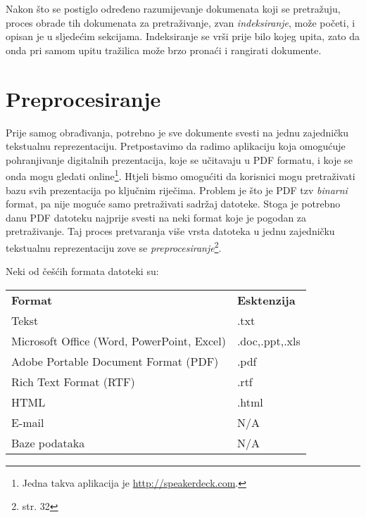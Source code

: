 \documentclass[11pt]{scrreprt}
\begin{document}
Nakon što se postiglo određeno razumijevanje dokumenata koji se pretražuju, proces obrade tih dokumenata za pretraživanje, zvan \textit{indeksiranje}, može početi, i opisan je u sljedećim sekcijama. Indeksiranje se vrši prije bilo kojeg upita, zato da onda pri samom upitu tražilica može brzo pronaći i rangirati dokumente.

\section{Preprocesiranje}

Prije samog obrađivanja, potrebno je sve dokumente svesti na jednu zajedničku tekstualnu reprezentaciju. Pretpostavimo da radimo aplikaciju koja omogućuje pohranjivanje digitalnih prezentacija, koje se učitavaju u PDF formatu, i koje se onda mogu gledati online\footnote{Jedna takva aplikacija je \url{http://speakerdeck.com}.}. Htjeli bismo omogućiti da korisnici mogu pretraživati bazu svih prezentacija po ključnim riječima. Problem je što je PDF tzv \textit{binarni} format, pa nije moguće samo pretraživati sadržaj datoteke. Stoga je potrebno danu PDF datoteku najprije svesti na neki format koje je pogodan za pretraživanje. Taj proces pretvaranja više vrsta datoteka u jednu zajedničku tekstualnu reprezentaciju zove se \textit{preprocesiranje}\footnote{\cite{taming} str. 32}.

Neki od češćih formata datoteki su:

\begin{center}
  \begin{tabular}{ll}
    \textbf{Format}                            & \textbf{Esktenzija} \\
    Tekst                                      & .txt                \\
    Microsoft Office (Word, PowerPoint, Excel) & .doc,.ppt,.xls      \\
    Adobe Portable Document Format (PDF)       & .pdf                \\
    Rich Text Format (RTF)                     & .rtf                \\
    HTML                                       & .html               \\
    E-mail                                     & N/A                 \\
    Baze podataka                              & N/A                 \\
  \end{tabular}
\end{center}
\end{document}
